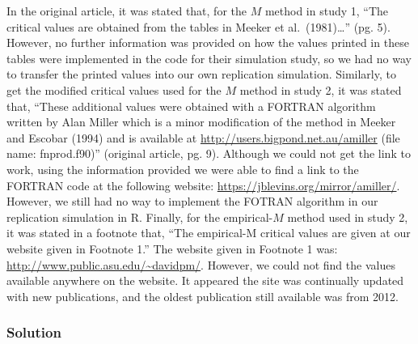 \documentclass[10,a4paperpaper,]{article}
\begin{document}
In the original article, it was stated that, for the \(M\) method in
study 1, ``The critical values are obtained from the tables in Meeker et
al.~(1981)\ldots{}'' (pg. 5). However, no further information was
provided on how the values printed in these tables were implemented in
the code for their simulation study, so we had no way to transfer the
printed values into our own replication simulation. Similarly, to get
the modified critical values used for the \(M\) method in study 2, it
was stated that, ``These additional values were obtained with a FORTRAN
algorithm written by Alan Miller which is a minor modification of the
method in Meeker and Escobar (1994) and is available at
\url{http://users.bigpond.net.au/amiller} (file name: fnprod.f90)''
(original article, pg. 9). Although we could not get the link to work,
using the information provided we were able to find a link to the
FORTRAN code at the following website:
\url{https://jblevins.org/mirror/amiller/}. However, we still had no way
to implement the FOTRAN algorithm in our replication simulation in R.
Finally, for the empirical-\(M\) method used in study 2, it was stated
in a footnote that, ``The empirical-M critical values are given at our
website given in Footnote 1.'' The website given in Footnote 1 was:
\url{http://www.public.asu.edu/~davidpm/}. However, we could not find
the values available anywhere on the website. It appeared the site was
continually updated with new publications, and the oldest publication
still available was from 2012.

\subsubsection{Solution}
\end{document}
